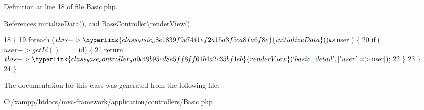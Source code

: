 Definition at line 18 of file Basic.\+php.



References initialize\+Data(), and Base\+Controller\textbackslash{}render\+View().


\begin{DoxyCode}
18                                    \{
19         \textcolor{keywordflow}{foreach} ($this->\hyperlink{class_basic_a8e1839f9e7441ef2a15a3f5ca8fa6f8e}{initializeData}() as $user ) \{
20             \textcolor{keywordflow}{if} ($user->getId() == $id) \{
21                 \textcolor{keywordflow}{return} $this->\hyperlink{class_base_controller_aa0c49b95cd8e5ff8ff61b4a2c35bf1eb}{renderView}(\textcolor{stringliteral}{'basic\_detail'}, [\textcolor{stringliteral}{'user'} => $user]);
22             \}
23         \}
24     \}
\end{DoxyCode}


The documentation for this class was generated from the following file\+:\begin{DoxyCompactItemize}
\item 
C\+:/xampp/htdocs/mvc-\/framework/application/controllers/\hyperlink{controllers_2_basic_8php}{Basic.\+php}\end{DoxyCompactItemize}
